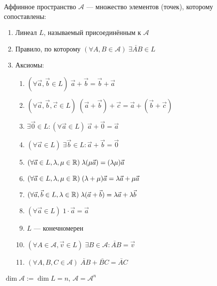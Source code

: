 \documentclass{article}
\begin{document}

\newcommand\A{\mathcal{A}}


Аффинное пространство $\A$ --- множество элементов (точек), которому сопоставлены:
\begin{enumerate}
	\item{}Линеал $L$, называемый присоединённым к $\A$
	\item{}Правило, по которому $(\forall A,B\in\A)\;\exists\lvec{AB}\in L$
	\item{}Аксиомы:
	\begin{enumerate}[label=\Roman*.]
		\item{}$(\forall \vec{a},\vec{b}\in L)\;\vec{a}+\vec{b}=\vec{b}+\vec{a}$
		\item{}$(\forall \vec{a},\vec{b},\vec{c}\in L)\;(\vec{a}+\vec{b})+\vec{c}=\vec{a}+(\vec{b}+\vec{c})$
		\item{}$\exists \vec{0}\in L:(\forall \vec{a}\in L)\;\vec{a}+\vec{0}=\vec{a}$
		\item{}$(\forall \vec{a}\in L)\;\exists \vec{b}\in L:\vec{a}+\vec{b}=\vec{0}$
		\item{}$(\forall \vec{a}\in L,\lambda, \mu\in\mathbb{R})\;\lambda(\mu\vec{a})=(\lambda\mu)\vec{a}$
		\item{}$(\forall \vec{a}\in L,\lambda,\mu\in\mathbb{R})\;(\lambda+\mu)\vec{a}=\lambda\vec{a}+\mu\vec{a}$
		\item{}$(\forall \vec{a},\vec{b}\in L,\lambda\in\mathbb{R})\;\lambda(\vec{a}+\vec{b})=\lambda\vec{a}+\lambda\vec{b}$
		\item{}$(\forall \vec{a}\in L)\;1\cdot\vec{a}=\vec{a}$

		\item{}$L$ --- конечномерен
		\item{}$(\forall A\in\A,\vec{v}\in L)\;\exists B\in\A:\lvec{AB}=\vec{v}$
		\item{}$(\forall A,B,C\in\A)\;\lvec{AB}+\lvec{BC}=\lvec{AC}$
	\end{enumerate}
\end{enumerate}

$\dim\A:=\dim L=n$, $\A=\A^{n}$
\end{document}
